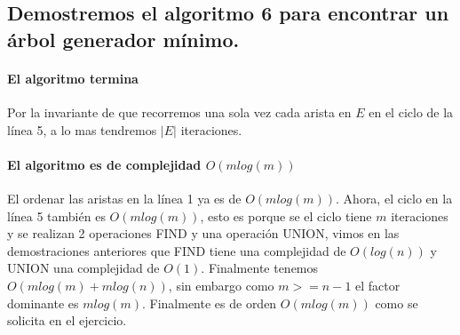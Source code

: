 \documentclass[12pt]{article}
\begin{document}
\subsection{Demostremos el algoritmo 6 para encontrar un árbol generador mínimo.}
\paragraph{El algoritmo termina}
Por la invariante de que recorremos una sola vez cada arista en $E$ en el ciclo de la línea 5, a lo mas tendremos $|E|$ iteraciones.
\paragraph{El algoritmo es de complejidad $O(mlog(m))$}
El ordenar las aristas en la línea 1 ya es de $O(mlog(m))$. Ahora, el ciclo en la línea 5 también es $O(mlog(m))$, esto es porque se el ciclo tiene $m$ iteraciones y se realizan 2 operaciones FIND y una operación UNION, vimos en las demostraciones anteriores que FIND tiene una complejidad de $O(log(n))$ y UNION una complejidad de $O(1)$. Finalmente tenemos $O(mlog(m) + mlog(n))$, sin embargo como $m>=n-1$ el factor dominante es $mlog(m)$. Finalmente es de orden $O(mlog(m))$ como se solicita en el ejercicio.
\end{document}
